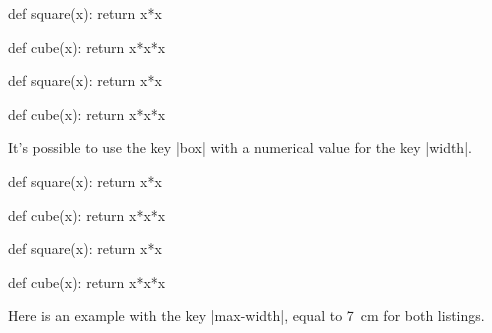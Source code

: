 \documentclass{article}
\begin{document}
\smallskip
\begin{Code}
\begin{center}
\begin{Piton}
def square(x):
    return x*x
\end{Piton}
\hspace{1cm}
\begin{Piton}
def cube(x):
    return x*x*x
\end{Piton}
\end{center}
\end{Code}

\begin{center}
\begin{Piton}
def square(x):
    return x*x
\end{Piton}
\hspace{1cm}
\begin{Piton}
def cube(x):
    return x*x*x
\end{Piton}
\end{center}

\vspace{1cm}
It's possible to use the key |box| with a numerical value for the key |width|.


\smallskip

\begin{Code}
\begin{center}
\begin{Piton}
def square(x):
    return x*x
\end{Piton}
\hspace{1cm}
\begin{Piton}
def cube(x):
    return x*x*x
\end{Piton}
\end{center}
\end{Code}

\begin{center}
\begin{Piton}
def square(x):
    return x*x
\end{Piton}
\hspace{1cm}
\begin{Piton}
def cube(x):
    return x*x*x
\end{Piton}
\end{center}

\vspace{1cm}
Here is an example with the key |max-width|, equal to 7~cm for both listings.
\end{document}
